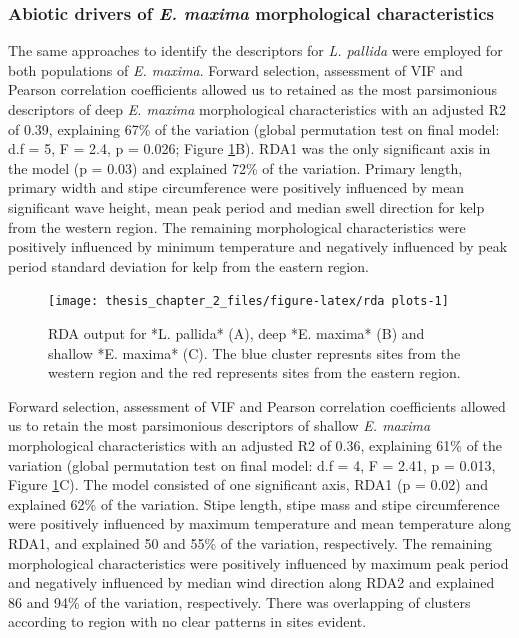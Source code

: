 \documentclass[
  a4paper,
]{article}
\begin{document}
\hypertarget{abiotic-drivers-of-e.-maxima-morphological-characteristics}{%
\subsubsection{\texorpdfstring{Abiotic drivers of \emph{E. maxima}
morphological
characteristics}{Abiotic drivers of E. maxima morphological characteristics}}\label{abiotic-drivers-of-e.-maxima-morphological-characteristics}}

The same approaches to identify the descriptors for \emph{L. pallida}
were employed for both populations of \emph{E. maxima}. Forward
selection, assessment of VIF and Pearson correlation coefficients
allowed us to retained as the most parsimonious descriptors of deep
\emph{E. maxima} morphological characteristics with an adjusted R2 of
0.39, explaining 67\% of the variation (global permutation test on final
model: d.f = 5, F = 2.4, p = 0.026; Figure \ref{fig:rda plots}B). RDA1
was the only significant axis in the model (p = 0.03) and explained 72\%
of the variation. Primary length, primary width and stipe circumference
were positively influenced by mean significant wave height, mean peak
period and median swell direction for kelp from the western region. The
remaining morphological characteristics were positively influenced by
minimum temperature and negatively influenced by peak period standard
deviation for kelp from the eastern region.

\begin{figure}

{\centering \texttt{[image: thesis\_chapter\_2\_files/figure-latex/rda plots-1]} 

}

\caption{\label{fig:rda plots}RDA output for *L. pallida* (A), deep *E. maxima* (B) and shallow *E. maxima* (C). The blue cluster represnts sites from the western region and the red represents sites from the eastern region.}\label{fig:rda plots}
\end{figure}

Forward selection, assessment of VIF and Pearson correlation
coefficients allowed us to retain the most parsimonious descriptors of
shallow \emph{E. maxima} morphological characteristics with an adjusted
R2 of 0.36, explaining 61\% of the variation (global permutation test on
final model: d.f = 4, F = 2.41, p = 0.013, Figure \ref{fig:rda plots}C).
The model consisted of one significant axis, RDA1 (p = 0.02) and
explained 62\% of the variation. Stipe length, stipe mass and stipe
circumference were positively influenced by maximum temperature and mean
temperature along RDA1, and explained 50 and 55\% of the variation,
respectively. The remaining morphological characteristics were
positively influenced by maximum peak period and negatively influenced
by median wind direction along RDA2 and explained 86 and 94\% of the
variation, respectively. There was overlapping of clusters according to
region with no clear patterns in sites evident.
\end{document}
